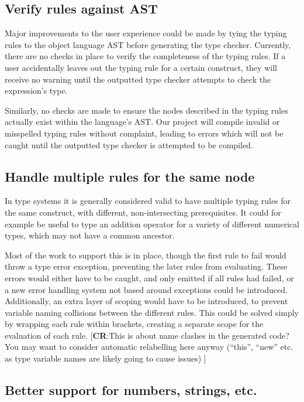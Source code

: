 \documentclass[nofilelist]{cslthse-msc}
\newcommand{\CR}[1]{\textcolor{green!60!black}{[\textbf{CR}:#1]}}
\begin{document}
\subsection{Verify rules against AST}
Major improvements to the user experience could be made by tying the typing rules to the object language AST before generating the type checker.
Currently, there are no checks in place to verify the completeness of the typing rules.
If a user accidentally leaves out the typing rule for a certain construct, they will receive no warning until the outputted type checker attempts to check the expression's type.

Similarly, no checks are made to ensure the nodes described in the typing rules actually exist within the language's AST.
Our project will compile invalid or misspelled typing rules without complaint, leading to errors which will not be caught until the outputted type checker is attempted to be compiled.

\subsection{Handle multiple rules for the same node}
In type systems it is generally considered valid to have multiple typing rules for the same construct, with different, non-intersecting prerequisites.
It could for example be useful to type an addition operator for a variety of different numerical types, which may not have a common ancestor.

Most of the work to support this is in place, though the first rule to fail would throw a type error exception, preventing the later rules from evaluating.
These errors would either have to be caught, and only emitted if all rules had failed, or a new error handling system not based around exceptions could be introduced.
Additionally, an extra layer of scoping would have to be introduced, to prevent variable naming collisions between the different rules.
This could be solved simply by wrapping each rule within brackets, creating a separate scope for the evaluation of each rule.
\CR{This is about name clashes in the generated code?  You may want to consider automatic relabelling here anyway (``this'', ``new'' etc. as type variable names are likely going to cause issues) }

\subsection{Better support for numbers, strings, etc.}
\end{document}
